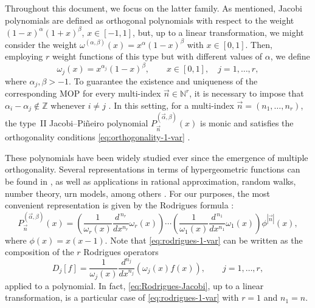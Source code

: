 \documentclass[11pt,reqno]{amsart}
\newcommand{\NN}{\mathbb{N}}
\newcommand{\ZZ}{\mathbb{Z}}
\theoremstyle{definition}
\begin{document}
Throughout this document, we focus on the latter family. As mentioned, Jacobi polynomials are defined as orthogonal polynomials with respect to the weight $(1-x)^\alpha(1+x)^\beta$, $x\in[-1,1]$, but, up to a linear transformation, we might consider the weight $\omega^{(\alpha,\beta)}(x)=x^\alpha(1-x)^\beta$ with $x\in[0,1]$. Then, employing $r$ weight functions of this type but with different values of $\alpha$, we define
\begin{equation}
\label{eq:JP-weights}
    \omega_j(x) = x^{\alpha_j} (1-x)^\beta, \qquad x\in[0,1],\quad j=1,\dots,r,
\end{equation}
where $\alpha_j, \beta > -1$. To guarantee the existence and uniqueness of the corresponding MOP for every multi-index $\vec n\in\NN^r$, it is necessary to impose that $\alpha_i - \alpha_j \notin \ZZ$ whenever $i\neq j$ \citep{ADL23}. In this setting, for a multi-index $\vec n=(n_1,\dots,n_r)$, the type~II Jacobi--Piñeiro polynomial $P^{(\vec \alpha,\beta)}_{\vec n}(x)$ is monic and satisfies the orthogonality conditions \eqref{eq:orthogonality-1-var} \citep[Section 3.7]{VA20}.


These polynomials have been widely studied ever since the emergence of multiple orthogonality. Several representations in terms of hypergeometric functions can be found in \citep{ABVA03, BCVA05}, as well as applications in rational approximation, random walks, number theory, urn models, among others \citep{BDFMAF23, BDFM25, Fis04, GI21, MFOSL22, MFVA16}. For our purposes, the most convenient representation is given by the Rodrigues formula \citep{ABVA03}:
\begin{equation}
    \label{eq:rodrigues-1-var}
    P^{(\vec \alpha, \beta)}_{\vec n}(x) = \left(\dfrac{1}{\omega_r(x)}\dfrac{d^{\,n_r}}{dx^{n_r}}\omega_r(x)\right)\cdots\left(\dfrac{1}{\omega_1(x)}\dfrac{d^{\,n_1}}{dx^{n_1}}\omega_1(x)\right)\phi^{|\vec n|}(x),
\end{equation}
where $\phi(x)=x(x-1)$. Note that \eqref{eq:rodrigues-1-var} can be written as the composition of the $r$ Rodrigues operators
\begin{equation}
    \label{eq:Rodrigues-operator-1-var}
    D_j[f]=\dfrac{1}{\omega_j(x)}\dfrac{d^{n_j}}{dx^{n_j}}(\omega_j(x)f(x)), \qquad j =1,\dots,r,
\end{equation}
applied to a polynomial. In fact, \eqref{eq:Rodrigues-Jacobi}, up to a linear transformation, is a particular case of \eqref{eq:rodrigues-1-var} with $r=1$ and $n_1=n$.
\end{document}
